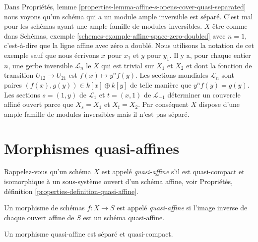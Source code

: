 \begin{remark}

\label{remark-affine-s-opens-cover-family}

Dans Propriétés, lemme \ref{properties-lemma-affine-s-opens-cover-quasi-separated}
nous voyons qu'un schéma qui a un module ample inversible est séparé. C'est mal pour les schémas ayant une ample famille de modules inversibles. $X$ être comme dans Schémas, exemple \ref{schemes-example-affine-space-zero-doubled}
avec $n = 1$, c'est-à-dire que la ligne affine avec zéro a doublé. Nous utilisons la notation de cet exemple sauf que nous écrivons $x$ pour $x_1$ et $y$
pour $y_1$. Il y a, pour chaque entier $n$, une gerbe inversible $\mathcal{L}_n$ le $X$ qui est trivial sur $X_1$ et
$X_2$ et dont la fonction de transition $U_{12} \to U_{21}$ est
$f(x) \mapsto y^n f(y)$. Les sections mondiales
$\mathcal{L}_n$ sont paires $(f(x), g(y)) \in k[x] \oplus
k[y]$ de telle manière que $y^n f(y) = g(y)$. Les sections $s = (1,
y)$ de $\mathcal{L}_1$ et $t = (x, 1)$ de
$\mathcal{L}_{-1}$ déterminer un couvercle affiné ouvert parce que
$X_s = X_1$ et $X_t = X_2$. Par conséquent $X$ dispose d'une ample famille de modules inversibles mais il n'est pas séparé.

\end{remark}









\section{Morphismes quasi-affines}
\label{section-quasi-affine}

\noindent
Rappelez-vous qu'un schéma $X$ est appelé {\it quasi-affine} s'il est quasi-compact et isomorphique à un sous-système ouvert d'un schéma affine, voir Propriétés, définition \ref{properties-definition-quasi-affine}.

\begin{definition}

\label{definition-quasi-affine}
Un morphisme de schémas $f : X \to S$ est appelé {\it quasi-affine} si l'image inverse de chaque ouvert affine de $S$ est un schéma quasi-affine.
\end{definition}

\begin{lemma}

\label{lemma-quasi-affine-separated}
Un morphisme quasi-affine est séparé et quasi-compact.
\end{lemma}

